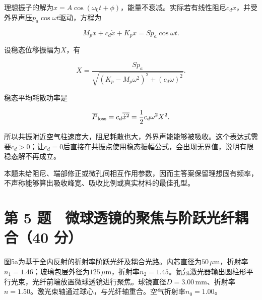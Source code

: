 \documentclass[12pt,a4paper,fontset=fandol]{ctexart}
\begin{document}
理想振子的解为\(x=A\cos(\omega_0t+\phi)\)，能量不衰减。实际若有线性阻尼\(c_d\dot x\)，并受外界声压\(p_a\cos\omega t\)驱动，方程为

\[
M_p\ddot x+c_d\dot x+K_px=Sp_a\cos\omega t.
\]

设稳态位移振幅为\(X\)，有

\[
X=\frac{Sp_a}
{\sqrt{(K_p-M_p\omega^2)^2+(c_d\omega)^2}}.
\]

稳态平均耗散功率是

\[
\overline P_{\rm loss}
=c_d\overline{\dot x^2}
=\frac12c_d\omega^2X^2.
\]

所以共振附近空气柱速度大，阻尼耗散也大，外界声能能够被吸收。这个表达式需要\(c_d>0\)；让\(c_d=0\)后直接在共振点使用稳态振幅公式，会出现无界值，说明有限稳态解不再成立。

本题未给阻尼、端部修正或微孔间相互作用参数，因而主答案保留理想固有频率，不声称能够算出吸收峰宽、吸收比例或真实材料的最佳孔型。

\clearpage

\section{第 5 题　微球透镜的聚焦与阶跃光纤耦合（40
分）}\label{ux7b2c-5-ux9898-ux5faeux7403ux900fux955cux7684ux805aux7126ux4e0eux9636ux8dc3ux5149ux7ea4ux8026ux540840-ux5206}

图5a为基于全内反射的折射率阶跃光纤及耦合光路。内芯直径为\(50\,\mu\mathrm m\)，折射率\(n_1=1.46\)；玻璃包层外径为\(125\,\mu\mathrm m\)，折射率\(n_2=1.45\)。氦氖激光器输出圆柱形平行光束，光纤前端放置微球透镜进行聚焦。球镜直径\(D=3.00\,\mathrm{mm}\)、折射率\(n=1.50\)。激光束轴通过球心，与光纤轴重合。空气折射率\(n_0=1.00\)。

\begin{center}
\begin{minipage}{\linewidth}
\centering\begingroup{}
\ifdim\wd\diagrambox>.88\linewidth
\sbox{\diagrambox}{\resizebox{.88\linewidth}{!}{\usebox{\diagrambox}}}\fi
\ifdim\ht\diagrambox>.38\textheight
\resizebox{!}{.38\textheight}{\usebox{\diagrambox}}
\else\usebox{\diagrambox}\fi
\par{}\endgroup\end{minipage}\end{center}
\end{document}

